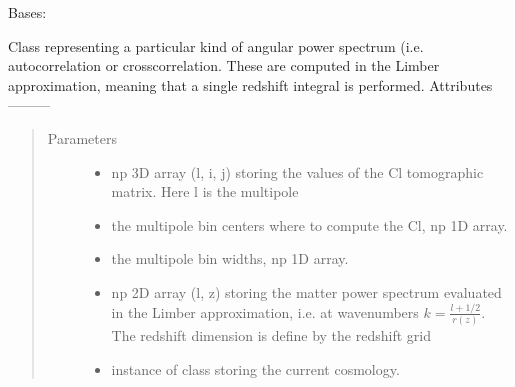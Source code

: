 \documentclass[letterpaper,10pt,english]{sphinxmanual}
\begin{document}
\begin{fulllineitems}
\label{\detokenize{api/seyfert.cosmology.c_ells.AngularCoefficient:seyfert.cosmology.c_ells.AngularCoefficient}}
\sphinxAtStartPar
Bases: 

\sphinxAtStartPar
Class representing a particular kind of angular power spectrum (i.e. auto\sphinxhyphen{}correlation or cross\sphinxhyphen{}correlation.
These are computed in the Limber approximation, meaning that a single redshift integral is performed.
Attributes
———\sphinxhyphen{}
\begin{quote}\begin{description}
\item[{Parameters}] \leavevmode\begin{itemize}
\item {} 
\sphinxAtStartPar
{} \textendash{} np 3D array (l, i, j) storing the values of the Cl tomographic matrix. Here l is the multipole

\item {} 
\sphinxAtStartPar
{} \textendash{} the multipole bin centers where to compute the Cl, np 1D array.

\item {} 
\sphinxAtStartPar
{} \textendash{} the multipole bin widths, np 1D array.

\item {} 
\sphinxAtStartPar
{} \textendash{} np 2D array (l, z) storing the matter power spectrum evaluated in the Limber
approximation, i.e. at wave\sphinxhyphen{}numbers \(k = \frac{l+1/2}{r(z)}\). The redshift dimension is define by the
redshift grid

\item {} 
\sphinxAtStartPar
{} \textendash{} instance of  class storing the current cosmology.


\end{itemize}
\end{description}
\end{quote}
\end{fulllineitems}
\end{document}
